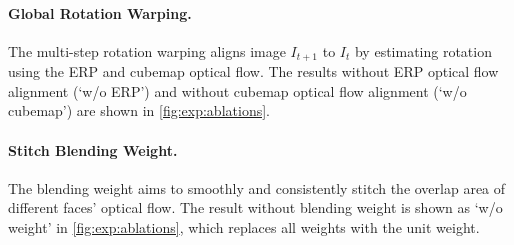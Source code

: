 \paragraph{Global Rotation Warping.}
The multi-step rotation warping aligns image $I_{t+1}$ to $I_t$ by estimating rotation using the ERP and cubemap optical flow.
The results without ERP optical flow alignment (`w/o ERP') and without cubemap optical flow alignment (`w/o cubemap') are shown in \cref{fig:exp:ablations}.

\vspace{-1em}
\paragraph{Stitch Blending Weight.}
The blending weight aims to smoothly and consistently stitch the overlap area of different faces' optical flow.
The result without blending weight is shown as `w/o weight' in \cref{fig:exp:ablations}, which replaces all weights with the unit weight.

